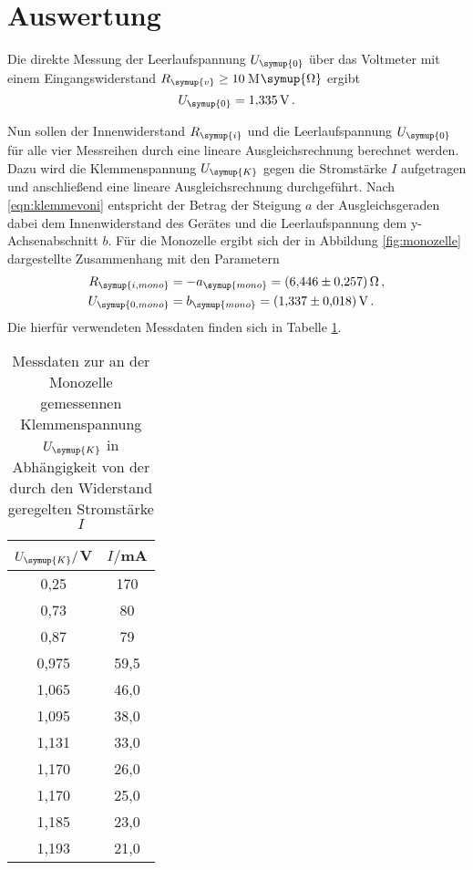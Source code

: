 \section{Auswertung}
\label{sec:Auswertung}

Die direkte Messung der Leerlaufspannung $U_{\symup{0}}$ über das Voltmeter
mit einem Eingangswiderstand $R_{\symup{v}}\geq10$\,M$\symup{\Omega}$ ergibt
\begin{equation}
  U_{\symup{0}} = \SI{1.335}{\volt}\,.
\end{equation}


Nun sollen der Innenwiderstand $R_{\symup{i}}$ und die Leerlaufspannung $U_{\symup{0}}$
für alle vier Messreihen durch eine lineare Ausgleichsrechnung berechnet werden.
Dazu wird die Klemmenspannung $U_{\symup{K}}$ gegen die Stromstärke $I$ aufgetragen
und anschließend eine lineare Ausgleichsrechnung durchgeführt.
Nach \eqref{eqn:klemmevoni} entspricht der Betrag der Steigung $a$ der Ausgleichsgeraden dabei dem Innenwiderstand des
Gerätes und die Leerlaufspannung dem y-Achsenabschnitt $b$. Für die Monozelle
ergibt sich der in Abbildung \ref{fig:monozelle} dargestellte Zusammenhang mit den
Parametern
\begin{align}
  R_{\symup{i,mono}}&=-a_{\symup{mono}} = \SI{6.446(0257)}{\ohm} \,, \\
  U_{\symup{0,mono}}&=b_{\symup{mono}} = \SI{1.337(0018)}{\volt} \,.
\end{align}
Die hierfür verwendeten Messdaten finden sich in Tabelle \ref{tab:monozelle}.

\begin{table}
  \centering
  \caption{Messdaten zur an der Monozelle gemessennen Klemmenspannung $U_{\symup{K}}$
  in Abhängigkeit von der durch den Widerstand geregelten Stromstärke $I$}
  \label{tab:monozelle}
  \begin{tabular}{c c}
    \toprule
    $U_{\symup{K}}/$V & $I/$mA\\
    \midrule
    0,25	&  170\\
    0,73	&  80\\
    0,87	&  79\\
    0,975	& 59,5\\
    1,065	& 46,0\\
    1,095	& 38,0\\
    1,131	& 33,0\\
    1,170	& 26,0\\
    1,170	& 25,0\\
    1,185	& 23,0\\
    1,193	& 21,0\\
    \bottomrule
  \end{tabular}
\end{table}

